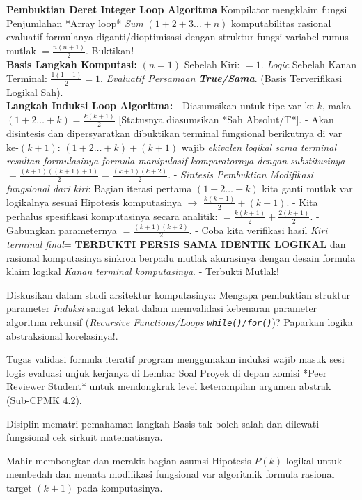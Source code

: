 \documentclass[../main.tex]{subfiles}
\begin{document}
\begin{contoh}
\textbf{Pembuktian Deret Integer Loop Algoritma}
Kompilator mengklaim fungsi Penjumlahan *Array loop* \textit{Sum} $(1 + 2 + 3 \dots + n)$ komputabilitas rasional evaluatif formulanya diganti/dioptimisasi dengan struktur fungsi variabel rumus mutlak $= \frac{n(n+1)}{2}$. Buktikan!
\\
\textbf{Basis Langkah Komputasi:} $(n=1)$
Sebelah Kiri: $= 1$. \textit{Logic} Sebelah Kanan Terminal: $\frac{1(1+1)}{2} = 1$. \textit{Evaluatif Persamaan \textbf{True/Sama}}. (Basis Terverifikasi Logikal Sah).
\\
\textbf{Langkah Induksi Loop Algoritma:}
- Diasumsikan untuk tipe var ke-$k$, maka $(1 + 2 \dots + k) = \frac{k(k+1)}{2}$ [Statusnya diasumsikan *Sah Absolut/T*].
- Akan disintesis dan dipersyaratkan dibuktikan terminal fungsional berikutnya di var ke-$(k+1)$:  $(1+2\dots+k) + (k+1) $ wajib \textit{ekivalen logikal sama terminal resultan formulasinya formula manipulasif komparatornya dengan substitusinya} $= \frac{(k+1)((k+1)+1)}{2} = \frac{(k+1)(k+2)}{2}$.
- \textit{Sintesis Pembuktian Modifikasi fungsional dari kiri}:
  Bagian iterasi pertama $(1+2\dots+k)$ kita ganti mutlak var logikalnya sesuai Hipotesis komputasinya $\to$ $\frac{k(k+1)}{2} + (k+1)$.
- Kita perhalus spesifikasi komputasinya secara analitik: $= \frac{k(k+1)}{2} + \frac{2(k+1)}{2}$.
- Gabungkan parameternya $ = \frac{(k+1)(k+2)}{2} $.
- Coba kita verifikasi hasil \textit{Kiri terminal final}= \textbf{TERBUKTI PERSIS SAMA IDENTIK LOGIKAL} dan rasional komputasinya sinkron berpadu mutlak akurasinya dengan desain formula klaim logikal \textit{Kanan terminal komputasinya}.
- Terbukti Mutlak!
\end{contoh}

\begin{aktivitas}
  \item Diskusikan dalam studi arsitektur komputasinya: Mengapa pembuktian struktur parameter \textit{Induksi} sangat lekat dalam memvalidasi kebenaran parameter algoritma rekursif (\textit{Recursive Functions/Loops \texttt{while()/for()}})? Paparkan logika abstraksional korelasinya!.
\end{aktivitas}

\begin{asesmen}
Tugas validasi formula iteratif program menggunakan induksi wajib masuk sesi logis evaluasi unjuk kerjanya di Lembar Soal Proyek di depan komisi *Peer Reviewer Student* untuk mendongkrak level keterampilan argumen abstrak (Sub-CPMK 4.2).
\end{asesmen}

\begin{checklist}
  \item Disiplin mematri pemahaman langkah Basis tak boleh salah dan dilewati fungsional cek sirkuit matematisnya. 
  \item Mahir membongkar dan merakit bagian asumsi Hipotesis $P(k)$ logikal untuk membedah dan menata modifikasi fungsional var algoritmik formula rasional target $(k+1)$ pada komputasinya.
\end{checklist}
\end{document}
